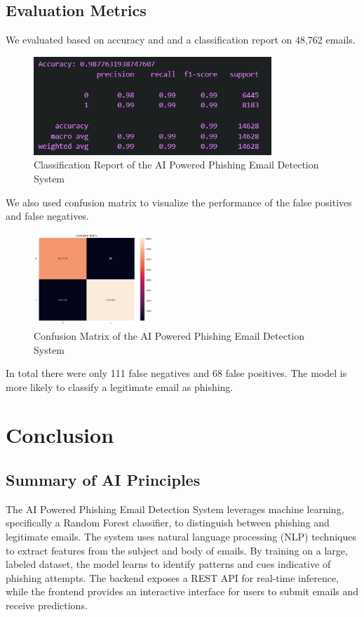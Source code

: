 \documentclass{article}
\begin{document}
\subsection{Evaluation Metrics}
We evaluated based on accuracy and and a classification report on 48,762 emails.
\begin{figure}[h!]
    \centering
    \includegraphics[width=0.8\textwidth]{classification_report.png}
    \caption{Classification Report of the AI Powered Phishing Email Detection System}
    \label{fig:classification-report}
\end{figure}
We also used confusion matrix to visualize the performance of the false positives and false negatives.
\begin{figure}[h!]
    \centering
    \includegraphics[width=0.4\textwidth]{confusion_matrix.png}
    \caption{Confusion Matrix of the AI Powered Phishing Email Detection System}
    \label{fig:confusion-matrix}
\end{figure}
In total there were only 111 false negatives and 68 false positives. The model is more likely to classify a legitimate email as phishing.
\newpage
\section{Conclusion}

\subsection{Summary of AI Principles}
The AI Powered Phishing Email Detection System leverages machine learning, specifically a Random Forest classifier, to distinguish between phishing and legitimate emails. The system uses natural language processing (NLP) techniques to extract features from the subject and body of emails. By training on a large, labeled dataset, the model learns to identify patterns and cues indicative of phishing attempts. The backend exposes a REST API for real-time inference, while the frontend provides an interactive interface for users to submit emails and receive predictions.
\end{document}
